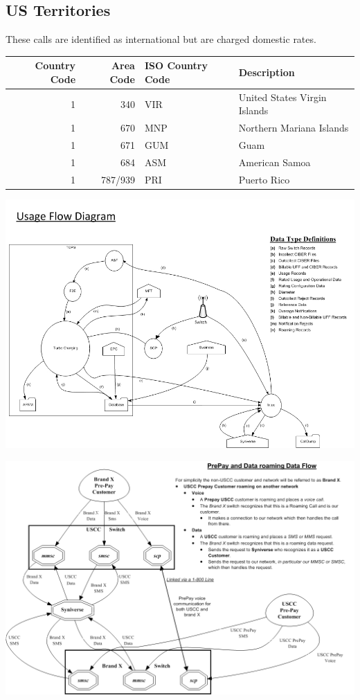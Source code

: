 \documentclass[12pt,twoside]{article}
\begin{document}
\subsection{US Territories}
\label{sec:orgheadline27}
These calls are identified as international but are charged
domestic rates.
\begin{center}
\begin{tabular}{rrll}
\hline
Country Code & Area Code & ISO Country Code & Description\\
\hline
1 & 340 & VIR & United States Virgin Islands\\
1 & 670 & MNP & Northern Mariana Islands\\
1 & 671 & GUM & Guam\\
1 & 684 & ASM & American Samoa\\
1 & 787/939 & PRI & Puerto Rico\\
\hline
\end{tabular}
\end{center}

\newpage 
\begin{landscape}  
\includegraphics[width=.9\linewidth]{Pictures/usage_flow.jpg}


\end{landscape} 
\newpage

\begin{landscape}  
\includegraphics[width=.9\linewidth]{Pictures/roamingPrePay.png}
\end{landscape} 
\newpage
\end{document}
